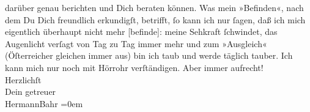 \begin{ledgroupsized}[t]{13cm}
               darüber genau berichten und Dich beraten können.\pend
           \pstart
           Was mein »Befinden«, nach dem Du Dich freundlich erkundigſt, betrifft, ſo kann ich
               nur ſagen, daß ich mich eigentlich überhaupt nicht {\pb}mehr {[}befinde{]}: meine Sehkraft ſchwindet, das Augenlicht verſagt
               von Tag zu Tag immer mehr und zum »Ausgleich« (Öſterreicher gleichen immer aus) bin ich taub und werde täglich tauber. Ich
               kann mich nur noch mit Hörrohr verſtändigen.\pend
           \pstart
           Aber immer aufrecht!{\\[\baselineskip]}Herzlichſt{\\[\baselineskip]}Dein getreuer{\\[\baselineskip]}\spacefill\mbox{HermannBahr}\pend
           \leftskip=0em{}
         
         \endnumbering{}\end{ledgroupsized}  \newcommand{\dateiname}{L02547}\newcommand{\titel}{Hermann Bahr an Arthur Schnitzler, 7. 9. 1931}\newcommand{\editorInnen}{ Kurt Ifkovits,  Martin Anton Müller}
      